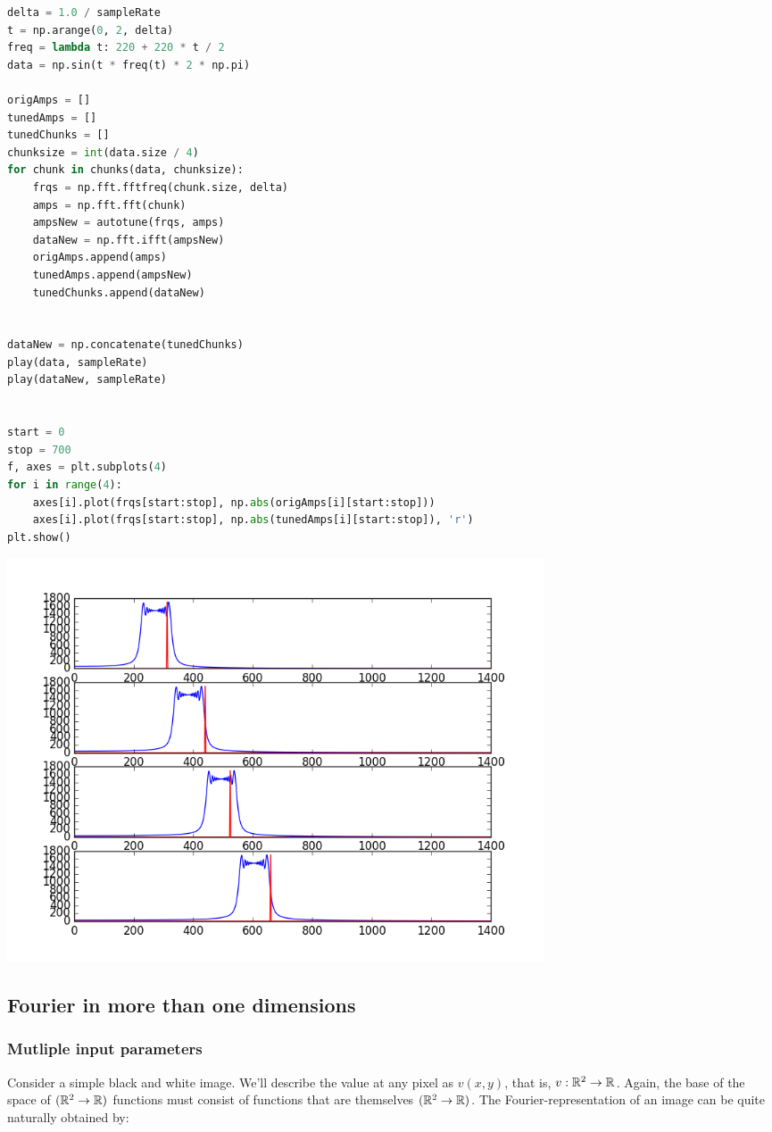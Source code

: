 \begin{lstlisting}[language=python]
delta = 1.0 / sampleRate
t = np.arange(0, 2, delta)
freq = lambda t: 220 + 220 * t / 2
data = np.sin(t * freq(t) * 2 * np.pi)

origAmps = []
tunedAmps = []
tunedChunks = []
chunksize = int(data.size / 4)
for chunk in chunks(data, chunksize):
    frqs = np.fft.fftfreq(chunk.size, delta)
    amps = np.fft.fft(chunk)
    ampsNew = autotune(frqs, amps)
    dataNew = np.fft.ifft(ampsNew)
    origAmps.append(amps)
    tunedAmps.append(ampsNew)
    tunedChunks.append(dataNew)


dataNew = np.concatenate(tunedChunks)
play(data, sampleRate)
play(dataNew, sampleRate)


start = 0
stop = 700
f, axes = plt.subplots(4)
for i in range(4):
    axes[i].plot(frqs[start:stop], np.abs(origAmps[i][start:stop]))
    axes[i].plot(frqs[start:stop], np.abs(tunedAmps[i][start:stop]), 'r')
plt.show()

\end{lstlisting}

\includegraphics[width=0.7\textwidth]{images/autotune.png}


\subsection{Fourier in more than one dimensions}

\subsubsection{Mutliple input parameters}
Consider a simple black and white image. We'll describe the value at any pixel as $v(x, y)$, that is, $v: \mathbb{R}^2 \to \mathbb{R}$. Again, the base of the space of $(\mathbb{R}^2 \to \mathbb{R})$ functions must consist of functions that are themselves $(\mathbb{R}^2 \to \mathbb{R})$. The Fourier-representation of an image can be quite naturally obtained by: 


